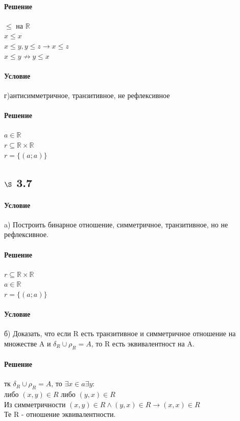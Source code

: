 \documentclass[a4paper,12pt]{article}
\begin{document}
\paragraph*{Решение}
$ \leq $ на $ \mathbb{R} $ \\
$ x \leq x$ \\
$ x \leq y, y \leq z \rightarrow x \leq z$\\
$ x \leq y \nrightarrow y \leq x$\\
\paragraph*{Условие}
г)антисимметричное, транзитивное, не рефлексивное\\
\paragraph*{Решение}
$ a \in \mathbb{R} $ \\
$ r \subseteq  \mathbb{R} \times \mathbb{R}$ \\
$ r=\{ (a;a) \} $\\

\subsection*{$\S$ 3.7}
\paragraph*{Условие}
a) Построить бинарное отношение, симметричное, транзитивное, но не рефлексивное.
\paragraph*{Решение}
$r\subseteq \mathbb{R} \times \mathbb{R}$\\
$ a \in \mathbb{R}$\\
$ r =\lbrace ( a; a ) \rbrace $\\
\paragraph*{Условие}
б) Доказать, что если R есть транзитивное и симметричное отношение на множестве A и $\delta_R\cup\rho_R = A$, то R есть эквивалентност на A.
\paragraph*{Решение}
тк $\delta_R\cup\rho_R = A$, то $\exists x \in a \exists y:$\\
либо $(x, y) \in R$ либо $(y, x) \in R$ \\
Из симметричности $(x, y) \in R \wedge (y, x) \in R \rightarrow (x, x) \in R$\\
Те R - отношение эквивалентности.
\end{document}
